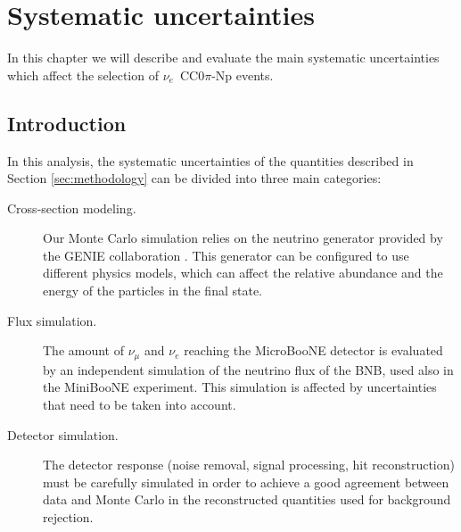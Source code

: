 \chapter{Systematic uncertainties}\label{sec:systematics}
\minitoc

In this chapter we will describe and evaluate the main systematic uncertainties which affect the selection of $\nu_e$~CC0$\pi$-Np events.

\section{Introduction}
In this analysis, the systematic uncertainties of the quantities described in Section \ref{sec:methodology} can be divided into three main categories: 
\begin{description}
\item[Cross-section modeling.] Our Monte Carlo simulation relies on the neutrino generator provided by the GENIE collaboration \cite{Andreopoulos:2009rq}. This generator can be configured to use different physics models, which can affect the relative abundance and the energy of the particles in the final state.
\item[Flux simulation.] The amount of $\nu_{\mu}$ and $\nu_{e}$ reaching the MicroBooNE detector is evaluated by an independent simulation of the neutrino flux of the BNB, used also in the MiniBooNE experiment. This simulation is affected by uncertainties that need to be taken into account.
\item[Detector simulation.] The detector response (noise removal, signal processing, hit reconstruction) must be carefully simulated in order to achieve a good agreement between data and Monte Carlo in the reconstructed quantities used for background rejection. 
\end{description}

